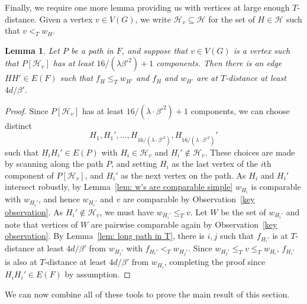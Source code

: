 \documentclass[10pt]{article}
\newtheorem{lemma}[theorem]{Lemma}
\theoremstyle{definition}
\let\leq\leqslant
\begin{document}
\par Finally, we require one more lemma providing us with vertices at large enough $T$-distance. Given a vertex $v\in V(G)$, we write $\mathcal H_v\subseteq\mathcal H$ for the set of $H\in\mathcal H$ such that $v<_T w_H$.

\begin{lemma}\label{lem: path cant split}    
    Let $P$ be a path in $F$, and suppose that $v\in V(G)$ is a vertex such that $P[\mathcal H_v]$ has at least $16/(\lambda  \beta'^2)+1$ components. Then there is an edge $HH'\in E(F)$ such that $f_H\leq_T w_{H'}$ and $f_H$ and $w_{H'}$ are at $T$-distance at least $4d/\beta' $.
\end{lemma}
\begin{proof}
    Since $P[\mathcal H_v]$ has at least $16/(\lambda \cdot \beta'^2 )+1$ components, we can choose distinct $$H_1,H_1',\ldots,H_{16/(\lambda \cdot \beta'^2 )},H_{16/(\lambda \cdot \beta'^2 )}'$$ such that $H_iH_i'\in E(P)$ with $H_i\in \mathcal H_v$ and $H_i'\notin \mathcal H_v$. These choices are made by scanning along the path $P$, and setting $H_i$ as the last vertex of the $i$th component of $P[\mathcal H_v]$, and $H_i'$ as the next vertex on the path. As $H_i$ and $H_i'$ intersect robustly, by Lemma~\ref{lem: w's are comparable simple} $w_{H_i}$ is comparable with $w_{H_i'}$, and hence $w_{H_i'}$ and $v$ are comparable by Observation~\ref{key observation}. As $H_i'\notin \mathcal H_v$, we must have $w_{H_i'}\leq_T v$. Let $W$ be the set of $w_{H_i'}$ and note that vertices of $W$ are pairwise comparable again by Observation~\ref{key observation}. By Lemma~\ref{lem: long path in T}, there is $i,j$ such that $f_{H_i'}$ is at $T$-distance at least $4d/\beta' $ from $w_{H_j'}$ with $f_{H_i'}<_Tw_{H_j'}$. Since $w_{H_j'}\leq_T v\leq_T w_{H_i}$, $f_{H_i'}$ is also at $T$-distance at least $4d/\beta' $ from $w_{H_i}$, completing the proof since $H_iH_i'\in E(F)$ by assumption.
\end{proof}
We can now combine all of these tools to prove the main result of this section.
\end{document}
